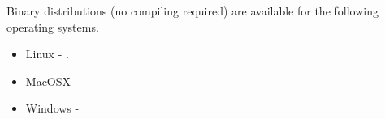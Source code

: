 
%
%
%


Binary distributions (no compiling required) are available for the following operating systems.
\begin{itemize}
 \item Linux - .
\item MacOSX - 
\item Windows - 
\end{itemize}

